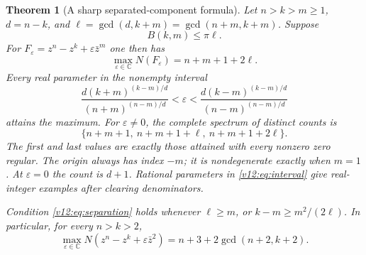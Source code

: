 \documentclass[UTF8,11pt]{ctexart}
\newtheorem{thm}{Theorem}[section]
\theoremstyle{definition}
\numberwithin{equation}{section}
\newcommand{\C}{\mathbb C}\newcommand{\R}{\mathbb R}
\begin{document}
\begin{thm}[A sharp separated-component formula]
\label{v12:thm:separated}
Let $n>k>m\ge1$, $d=n-k$, and
$\ell=\gcd(d,k+m)=\gcd(n+m,k+m)$. Suppose
\begin{equation}\label{v12:eq:separation}
 B(k,m)\le\pi\ell.
\end{equation}
For $F_\varepsilon=z^n-z^k+\varepsilon\bar z^m$ one then has
\begin{equation}\label{v12:eq:maximum}
 \max_{\varepsilon\in\C}N(F_\varepsilon)=n+m+1+2\ell.
\end{equation}
Every real parameter in the nonempty interval
\begin{equation}\label{v12:eq:interval}
 \frac{d(k+m)^{(k-m)/d}}{(n+m)^{(n-m)/d}}
 <\varepsilon<
 \frac{d(k-m)^{(k-m)/d}}{(n-m)^{(n-m)/d}}
\end{equation}
attains the maximum. For $\varepsilon\ne0$, the complete spectrum
of distinct counts is
\begin{equation}\label{v12:eq:spectrum}
 \{n+m+1,\ n+m+1+\ell,\ n+m+1+2\ell\}.
\end{equation}
The first and last values are exactly those attained with every
nonzero zero regular. The origin always has index $-m$; it is
nondegenerate exactly when $m=1$. At $\varepsilon=0$ the count is
$d+1$. Rational parameters in \eqref{v12:eq:interval} give
real-integer examples after clearing denominators.

Condition \eqref{v12:eq:separation} holds whenever $\ell\ge m$,
or $k-m\ge m^2/(2\ell)$. In particular, for every $n>k>2$,
\begin{equation}\label{v12:eq:m2}
 \boxed{\displaystyle
 \max_{\varepsilon\in\C}N(z^n-z^k+\varepsilon\bar z^2)
 =n+3+2\gcd(n+2,k+2).}
\end{equation}
\end{thm}
\end{document}
